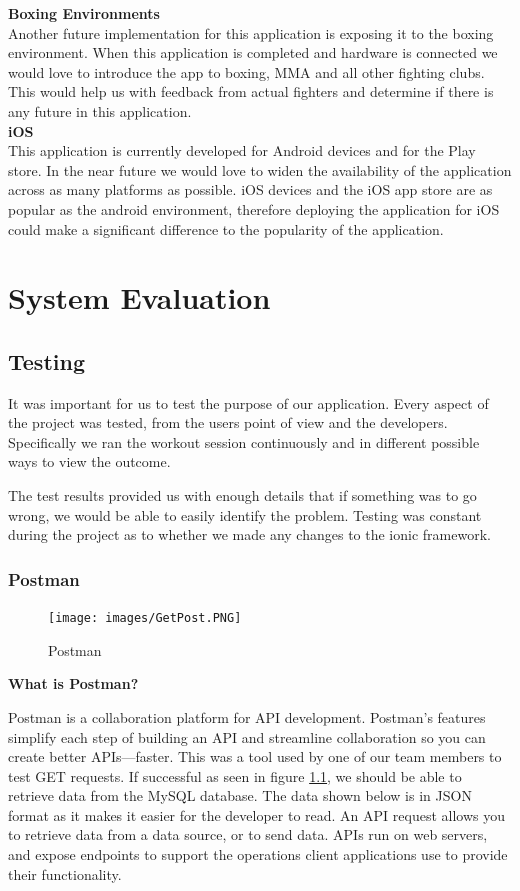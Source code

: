 \documentclass[a4paper,12pt]{report}
\begin{document}
\textbf{Boxing Environments}\\
Another future implementation for this application is exposing it to the boxing environment. When this application is completed and hardware is connected we would love to introduce the app to boxing, MMA and all other fighting clubs.
This would help us with feedback from actual fighters and determine if there is any future in this application.\\

\textbf{iOS}\\
This application is currently developed for  Android devices and for the Play store. In the near future we would love to widen the availability of the application across as many platforms as possible.
iOS devices and the iOS app store are as popular as the android environment, therefore deploying the application for iOS could make a significant difference to the popularity of the application.
\chapter{System Evaluation}
\section{Testing}
It was important for us to test the purpose of our application. Every aspect of the project was tested, from the users point of view and the developers. Specifically we ran the workout session continuously and in different possible ways to view the outcome.

The test results provided us with enough details that if something was to go wrong,  we would be able to easily identify the problem. Testing was constant during the project as to whether we made any changes to the ionic framework.
\subsection{Postman}
\begin{figure}[h]
\begin{center}
\texttt{[image: images/GetPost.PNG]}
\end{center}
\caption{Postman}
\label{fig:postman}
\end{figure}

\textbf{What is Postman?}

Postman is a collaboration platform for API development. Postman's features simplify each step of building an API and streamline collaboration so you can create better APIs—faster. This was a tool used by one of our team members to test GET requests. If successful as seen in figure \ref{fig:postman}, we should be able to retrieve data from the MySQL database. The data shown below is in JSON format as it makes it easier for the developer to read. An API request allows you to retrieve data from a data source, or to send data. APIs run on web servers, and expose endpoints to support the operations client applications use to provide their functionality.
\end{document}
